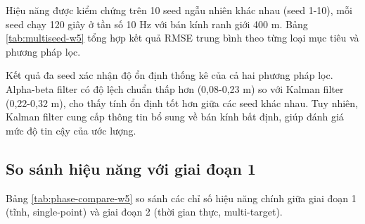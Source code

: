 \hspace{0.5cm} Hiệu năng được kiểm chứng trên 10 seed ngẫu nhiên khác nhau (seed 1-10), mỗi seed chạy 120 giây ở tần số 10 Hz với bán kính ranh giới 400 m. Bảng \ref{tab:multiseed-w5} tổng hợp kết quả RMSE trung bình theo từng loại mục tiêu và phương pháp lọc.

\begin{table}[H]
\centering
{}
\caption{Kết quả đa seed (10 seed, 120 giây, 10 Hz, ranh giới 400 m)}
\label{tab:multiseed-w5}
\end{table}

Kết quả đa seed xác nhận độ ổn định thống kê của cả hai phương pháp lọc. Alpha-beta filter có độ lệch chuẩn thấp hơn (0,08-0,23 m) so với Kalman filter (0,22-0,32 m), cho thấy tính ổn định tốt hơn giữa các seed khác nhau. Tuy nhiên, Kalman filter cung cấp thông tin bổ sung về bán kính bất định, giúp đánh giá mức độ tin cậy của ước lượng.

\subsection{So sánh hiệu năng với giai đoạn 1}

\hspace{0.5cm} Bảng \ref{tab:phase-compare-w5} so sánh các chỉ số hiệu năng chính giữa giai đoạn 1 (tĩnh, single-point) và giai đoạn 2 (thời gian thực, multi-target).

